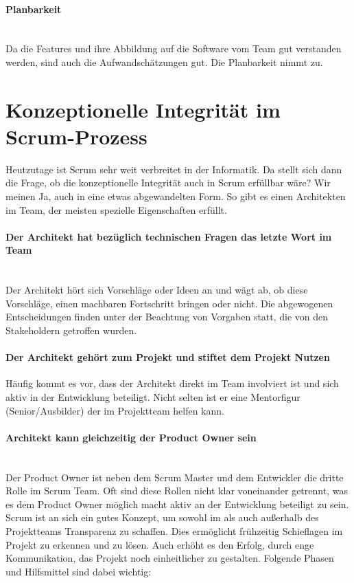\documentclass[a4paper, ngerman, 12pt, usenames, dvipsnames]{article}
\begin{document}
\paragraph{Planbarkeit}\mbox{} \\
Da die Features und ihre Abbildung auf die Software vom Team gut verstanden werden, sind auch die Aufwandschätzungen gut. Die Planbarkeit nimmt zu.

\section{Konzeptionelle Integrität im Scrum-Prozess}
Heutzutage ist Scrum sehr weit verbreitet in der Informatik. Da stellt sich dann die Frage, ob die konzeptionelle Integrität auch in Scrum erfüllbar wäre?
Wir meinen Ja, auch in eine etwas abgewandelten Form. So gibt es einen Architekten im Team, der meisten spezielle Eigenschaften erfüllt.

    \paragraph{Der Architekt hat bezüglich technischen Fragen das letzte Wort im Team}\mbox{} \\
    Der Architekt hört sich Vorschläge oder Ideen an und wägt ab, ob diese Vorschläge, einen machbaren Fortschritt bringen oder nicht.
    Die abgewogenen Entscheidungen finden unter der Beachtung von Vorgaben statt, die von den Stakeholdern getroffen wurden.
    \paragraph{Der Architekt gehört zum Projekt und stiftet dem Projekt Nutzen}\mbox{} 
    Häufig kommt es vor, dass der Architekt direkt im Team involviert ist und sich aktiv in der Entwicklung beteiligt.
    Nicht selten ist er eine Mentorfigur (Senior/Ausbilder) der im Projektteam helfen kann.
    \paragraph{Architekt kann gleichzeitig der Product Owner sein}\mbox{} \\
    Der Product Owner ist neben dem Scrum Master und dem Entwickler die dritte Rolle im Scrum Team.
    Oft sind diese Rollen nicht klar voneinander getrennt, was es dem Product Owner möglich macht aktiv an der Entwicklung beteiligt zu sein.\\
    
    Scrum ist an sich ein gutes Konzept, um sowohl im als auch außerhalb des Projektteams Transparenz zu schaffen.
    Dies ermöglicht frühzeitig Schieflagen im Projekt zu erkennen und zu lösen. Auch erhöht es den Erfolg, durch enge Kommunikation, das Projekt noch einheitlicher zu gestalten.
    Folgende Phasen und Hilfsmittel sind dabei wichtig:
\end{document}
